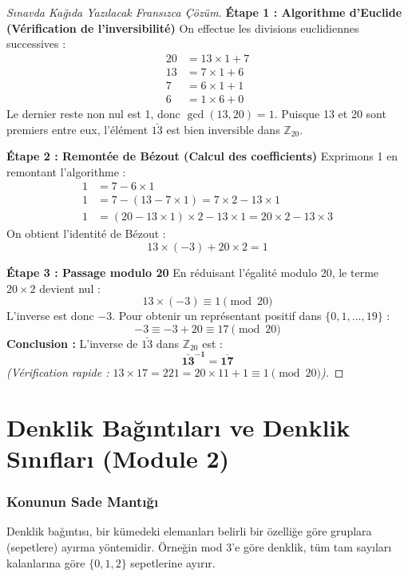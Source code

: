 \documentclass[11pt,a4paper]{article}
\begin{document}
\begin{proof}[Sınavda Kağıda Yazılacak Fransızca Çözüm]
\textbf{Étape 1 : Algorithme d'Euclide (Vérification de l'inversibilité)}  
On effectue les divisions euclidiennes successives :
\begin{align*}
20 &= 13 \times 1 + 7 \\
13 &= 7 \times 1 + 6 \\
7 &= 6 \times 1 + 1 \\
6 &= 1 \times 6 + 0
\end{align*}
Le dernier reste non nul est 1, donc $\gcd(13, 20) = 1$.  
Puisque 13 et 20 sont premiers entre eux, l'élément $\bar{13}$ est bien inversible dans $\mathbb{Z}_{20}$.

\vspace{0.2cm}
\textbf{Étape 2 : Remontée de Bézout (Calcul des coefficients)}  
Exprimons 1 en remontant l'algorithme :
\begin{align*}
1 &= 7 - 6 \times 1 \\
1 &= 7 - (13 - 7 \times 1) = 7 \times 2 - 13 \times 1 \\
1 &= (20 - 13 \times 1) \times 2 - 13 \times 1 = 20 \times 2 - 13 \times 3
\end{align*}
On obtient l'identité de Bézout :
\[ 13 \times (-3) + 20 \times 2 = 1 \]

\vspace{0.2cm}
\textbf{Étape 3 : Passage modulo 20}  
En réduisant l'égalité modulo 20, le terme $20 \times 2$ devient nul :
\[ 13 \times (-3) \equiv 1 \pmod{20} \]
L'inverse est donc $-3$. Pour obtenir un représentant positif dans $\{0, 1, \dots, 19\}$ :
\[ -3 \equiv -3 + 20 \equiv 17 \pmod{20} \]
\textbf{Conclusion :} L'inverse de $\bar{13}$ dans $\mathbb{Z}_{20}$ est :
\[ \mathbf{\bar{13}^{-1} = \overline{17}} \]
\textit{(Vérification rapide : $13 \times 17 = 221 = 20 \times 11 + 1 \equiv 1 \pmod{20}$).}
\end{proof}

\vspace{0.5cm}

\section{Denklik Bağıntıları ve Denklik Sınıfları (Module 2)}

\subsubsection*{Konunun Sade Mantığı}
Denklik bağıntısı, bir kümedeki elemanları belirli bir özelliğe göre gruplara (sepetlere) ayırma yöntemidir. Örneğin mod 3'e göre denklik, tüm tam sayıları kalanlarına göre $\{0, 1, 2\}$ sepetlerine ayırır.
\end{document}
